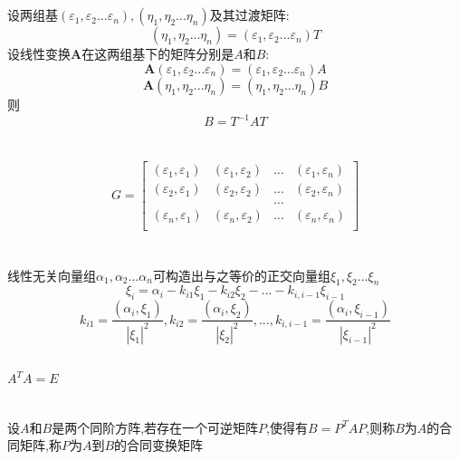 \documentclass[11pt, a4paper, UTF8]{ctexart}
\begin{document}
\subsection{}
设两组基$(\varepsilon_1,\varepsilon_2...\varepsilon_n),(\eta_1,\eta_2...\eta_n)$及其过渡矩阵:
\[(\eta_1,\eta_2...\eta_n)=(\varepsilon_1,\varepsilon_2...\varepsilon_n)T\]
设线性变换$\bm A$在这两组基下的矩阵分别是$A$和$B$:
\[\bm A(\varepsilon_1,\varepsilon_2...\varepsilon_n)=(\varepsilon_1,\varepsilon_2...\varepsilon_n)A\]
\[\bm A(\eta_1,\eta_2...\eta_n)=(\eta_1,\eta_2...\eta_n)B\]
则
\[B=T^{-1}AT\]
\section{}
\[G=\begin{bmatrix}
(\varepsilon_1,\varepsilon_1)&(\varepsilon_1,\varepsilon_2)&...&(\varepsilon_1,\varepsilon_n)\\
(\varepsilon_2,\varepsilon_1)&(\varepsilon_2,\varepsilon_2)&...&(\varepsilon_2,\varepsilon_n)\\
&&...&\\
(\varepsilon_n,\varepsilon_1)&(\varepsilon_n,\varepsilon_2)&...&(\varepsilon_n,\varepsilon_n)\\
\end{bmatrix}\]
\section{}
\subsection{}
线性无关向量组$\alpha_1,\alpha_2...\alpha_n$可构造出与之等价的正交向量组$\xi_1,\xi_2...\xi_n$
\[\xi_i=\alpha_i-k_{i1}\xi_1-k_{i2}\xi_2-...-k_{i,i-1}\xi_{i-1}\]
\[k_{i1}=\dfrac{(\alpha_i,\xi_1)}{|\xi_1|^2},k_{i2}=\dfrac{(\alpha_i,\xi_2)}{|\xi_2|^2},...,k_{i,i-1}=\dfrac{(\alpha_i,\xi_{i-1})}{|\xi_{i-1}|^2}\]
\subsection{}
$A^TA=E$
\section{}
设$A$和$B$是两个同阶方阵,若存在一个可逆矩阵$P$,使得有$B=P^TAP$,则称$B$为$A$的合同矩阵,称$P$为$A$到$B$的合同变换矩阵
\end{document}
